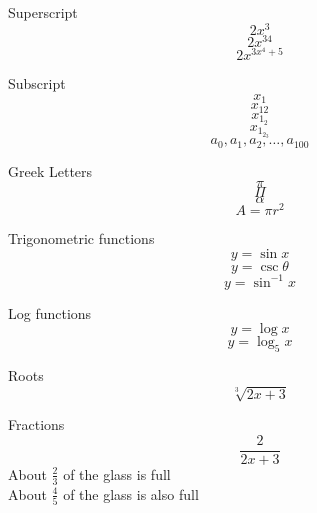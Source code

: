 \documentclass[11pt]{article}
\begin{document}
Superscript
$$2x^3$$
$$2x^{34}$$
$$2x^{3x^4+5}$$

Subscript
$$x_1$$
$$x_{12}$$
$$x_{1_2}$$
$$x_{1_{2_3}}$$
$$a_0, a_1, a_2, \ldots, a_{100}$$

Greek Letters
$$\pi$$
$$\Pi$$
$$\alpha$$
$$A = \pi r^2$$

Trigonometric functions
$$y = \sin x$$
$$y = \csc \theta$$
$$y = \sin^{-1} x$$

Log functions
$$y = \log x$$
$$y = \log_{5} x$$

Roots
$$\sqrt[3]{2x+3}$$

Fractions
$$\frac{2}{2x+3}$$
About $\frac{2}{3}$ of the glass is full \\[12pt]
About $\frac{4}{5}$ of the glass is also full
\end{document}
